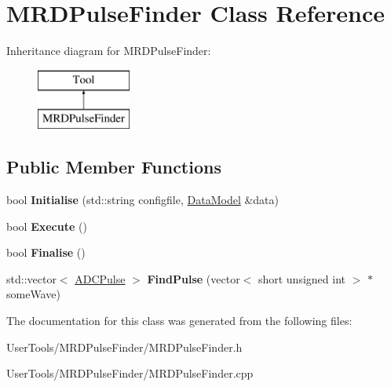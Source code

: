 \hypertarget{classMRDPulseFinder}{\section{M\-R\-D\-Pulse\-Finder Class Reference}
\label{classMRDPulseFinder}
}
Inheritance diagram for M\-R\-D\-Pulse\-Finder\-:\begin{figure}[H]
\begin{center}
\leavevmode
\includegraphics[height=2.000000cm]{classMRDPulseFinder}
\end{center}
\end{figure}
\subsection*{Public Member Functions}
\begin{DoxyCompactItemize}
\item 
\hypertarget{classMRDPulseFinder_ad64f6c541f6d5cc2cb1036a9249837c5}{bool {\bfseries Initialise} (std\-::string configfile, \hyperlink{classDataModel}{Data\-Model} \&data)}\label{classMRDPulseFinder_ad64f6c541f6d5cc2cb1036a9249837c5}

\item 
\hypertarget{classMRDPulseFinder_adff581ca17c601b5ec24a96ad6b85941}{bool {\bfseries Execute} ()}\label{classMRDPulseFinder_adff581ca17c601b5ec24a96ad6b85941}

\item 
\hypertarget{classMRDPulseFinder_a492f228151d4af0a6f07e21ff7e732b0}{bool {\bfseries Finalise} ()}\label{classMRDPulseFinder_a492f228151d4af0a6f07e21ff7e732b0}

\item 
\hypertarget{classMRDPulseFinder_ab82aeb6cbc87a8d0f88252335f261d33}{std\-::vector$<$ \hyperlink{classADCPulse}{A\-D\-C\-Pulse} $>$ {\bfseries Find\-Pulse} (vector$<$ short unsigned int $>$ $\ast$some\-Wave)}\label{classMRDPulseFinder_ab82aeb6cbc87a8d0f88252335f261d33}

\end{DoxyCompactItemize}


The documentation for this class was generated from the following files\-:\begin{DoxyCompactItemize}
\item 
User\-Tools/\-M\-R\-D\-Pulse\-Finder/M\-R\-D\-Pulse\-Finder.\-h\item 
User\-Tools/\-M\-R\-D\-Pulse\-Finder/M\-R\-D\-Pulse\-Finder.\-cpp\end{DoxyCompactItemize}

